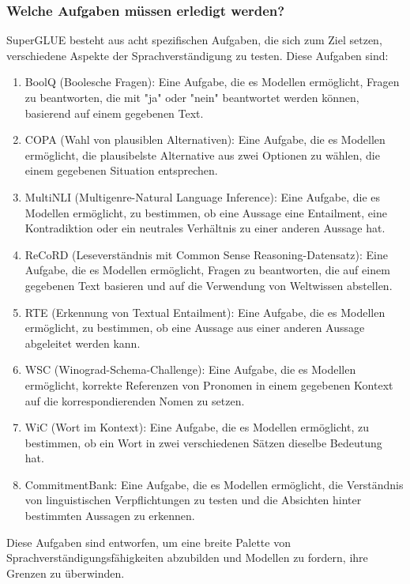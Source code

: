 \subsubsection*{Welche Aufgaben müssen erledigt werden?}

SuperGLUE besteht aus acht spezifischen Aufgaben, die sich zum Ziel setzen, verschiedene Aspekte der Sprachverständigung zu testen. Diese Aufgaben sind:

\begin{enumerate}
\item BoolQ (Boolesche Fragen): Eine Aufgabe, die es Modellen ermöglicht, Fragen zu beantworten, die mit "ja" oder "nein" beantwortet werden können, basierend auf einem gegebenen Text.
\item COPA (Wahl von plausiblen Alternativen): Eine Aufgabe, die es Modellen ermöglicht, die plausibelste Alternative aus zwei Optionen zu wählen, die einem gegebenen Situation entsprechen.
\item MultiNLI (Multigenre-Natural Language Inference): Eine Aufgabe, die es Modellen ermöglicht, zu bestimmen, ob eine Aussage eine Entailment, eine Kontradiktion oder ein neutrales Verhältnis zu einer anderen Aussage hat.
\item ReCoRD (Leseverständnis mit Common Sense Reasoning-Datensatz): Eine Aufgabe, die es Modellen ermöglicht, Fragen zu beantworten, die auf einem gegebenen Text basieren und auf die Verwendung von Weltwissen abstellen.
\item RTE (Erkennung von Textual Entailment): Eine Aufgabe, die es Modellen ermöglicht, zu bestimmen, ob eine Aussage aus einer anderen Aussage abgeleitet werden kann.
\item WSC (Winograd-Schema-Challenge): Eine Aufgabe, die es Modellen ermöglicht, korrekte Referenzen von Pronomen in einem gegebenen Kontext auf die korrespondierenden Nomen zu setzen.
\item WiC (Wort im Kontext): Eine Aufgabe, die es Modellen ermöglicht, zu bestimmen, ob ein Wort in zwei verschiedenen Sätzen dieselbe Bedeutung hat.
\item CommitmentBank: Eine Aufgabe, die es Modellen ermöglicht, die Verständnis von linguistischen Verpflichtungen zu testen und die Absichten hinter bestimmten Aussagen zu erkennen.
\end{enumerate}

Diese Aufgaben sind entworfen, um eine breite Palette von Sprachverständigungsfähigkeiten abzubilden und Modellen zu fordern, ihre Grenzen zu überwinden.

